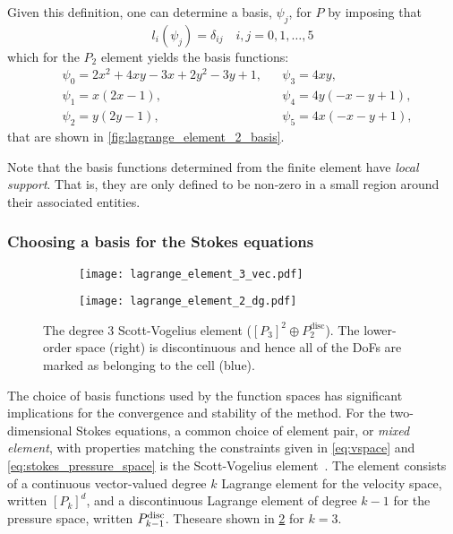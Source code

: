 \documentclass[thesis]{subfiles}
\begin{document}
Given this definition, one can determine a basis, $\psi_j$, for $P$ by imposing that
\begin{equation}
  l_i(\psi_j) = \delta_{ij} \quad i, j = 0, 1, \dots, 5
\end{equation}
which for the $P_2$ element yields the basis functions:
\begin{align*}
  &\psi_0 = 2x^2 + 4xy - 3x + 2y^2-3y+1,
  &
  &\psi_3 = 4xy, \\
  &\psi_1 = x(2x-1),
  &
  &\psi_4 = 4y(-x-y+1), \\
  &\psi_2 = y(2y-1),
  &
  &\psi_5 = 4x(-x-y+1),
\end{align*}
that are shown in \cref{fig:lagrange_element_2_basis}.

Note that the basis functions determined from the finite element have \emph{local support}.
That is, they are only defined to be non-zero in a small region around their associated entities.

\subsubsection{Choosing a basis for the Stokes equations}

\begin{figure}
  \centering
  \begin{subfigure}{.35\textwidth}
    \centering
    \texttt{[image: lagrange\_element\_3\_vec.pdf]}
    \label{fig:scott_vogelius_element_P3}
  \end{subfigure}
  \begin{subfigure}{.35\textwidth}
    \centering
    \texttt{[image: lagrange\_element\_2\_dg.pdf]}
  \end{subfigure}
  \caption{
    The degree 3 Scott-Vogelius element ($[P_3]^2 \oplus P_2^\mathrm{disc}$).
    The lower-order space (right) is discontinuous and hence all of the DoFs are marked as belonging to the cell (blue).
  }
  \label{fig:scott_vogelius_element}
\end{figure}

The choice of basis functions used by the function spaces has significant implications for the convergence and stability of the method.
For the two-dimensional Stokes equations, a common choice of element pair, or \emph{mixed element}, with properties matching the constraints given in \cref{eq:vspace} and \cref{eq:stokes_pressure_space} is the Scott-Vogelius element~\cite{scottNormEstimatesMaximal1985}.
The element consists of a continuous vector-valued degree $k$ Lagrange element for the velocity space, written $[P_k]^d$, and a discontinuous Lagrange element of degree $k-1$ for the pressure space, written $P_{k-1}^{\textnormal{disc}}$.
These\footnotemark are shown in \cref{fig:scott_vogelius_element} for $k = 3$.
\end{document}
